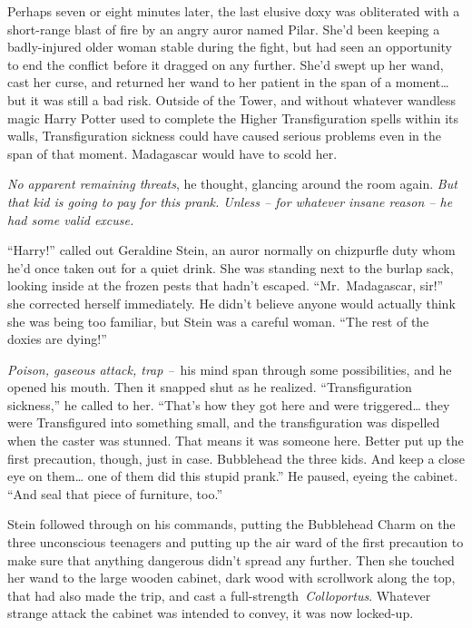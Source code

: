 Perhaps seven or eight minutes later, the last elusive doxy was
obliterated with a short-range blast of fire by an angry auror named
Pilar. She'd been keeping a badly-injured older woman stable during the
fight, but had seen an opportunity to end the conflict before it dragged
on any further. She'd swept up her wand, cast her curse, and returned
her wand to her patient in the span of a moment\ldots{} but it was still
a bad risk. Outside of the Tower, and without whatever wandless magic
Harry Potter used to complete the Higher Transfiguration spells within
its walls, Transfiguration sickness could have caused serious problems
even in the span of that moment. Madagascar would have to scold her.

\emph{No apparent remaining threats}, he thought, glancing around the
room again. \emph{But that kid is going to pay for this prank. Unless --
for whatever insane reason -- he had some valid excuse.}

``Harry!'' called out Geraldine Stein, an auror normally on chizpurfle
duty whom he'd once taken out for a quiet drink. She was standing next
to the burlap sack, looking inside at the frozen pests that hadn't
escaped. ``Mr.~Madagascar, sir!'' she corrected herself immediately. He
didn't believe anyone would actually think she was being too familiar,
but Stein was a careful woman. ``The rest of the doxies are dying!''

\emph{Poison, gaseous attack, trap --}~his mind span through some
possibilities, and he opened his mouth. Then it snapped shut as he
realized. ``Transfiguration sickness,'' he called to her. ``That's how
they got here and were triggered\ldots{} they were Transfigured into
something small, and the transfiguration was dispelled when the caster
was stunned. That means it was someone here. Better put up the first
precaution, though, just in case. Bubblehead the three kids. And keep a
close eye on them\ldots{} one of them did this stupid prank.'' He
paused, eyeing the cabinet. ``And seal that piece of furniture, too.''

Stein followed through on his commands, putting the Bubblehead Charm on
the three unconscious teenagers and putting up the air ward of the first
precaution to make sure that anything dangerous didn't spread any
further. Then she touched her wand to the large wooden cabinet, dark
wood with scrollwork along the top, that had also made the trip, and
cast a full-strength~\emph{Colloportus}. Whatever strange attack the
cabinet was intended to convey, it was now locked-up.

